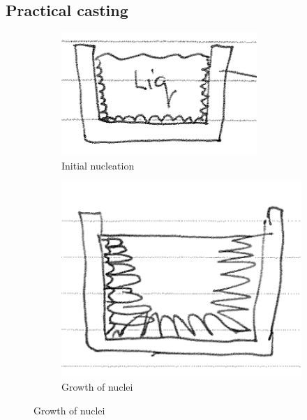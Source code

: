 \documentclass[class=report, crop=false, 12pt,a4paper]{standalone}
\begin{document}
\subsection{Practical casting}
\begin{figure}[h!]
  \centering
  \begin{subfigure}[b]{0.3\textwidth}
      \includegraphics[width=\textwidth]{../img/practicalcasting1}
      \caption{Initial nucleation}
      \label{fig:practicalcasting1}
  \end{subfigure}
  \begin{subfigure}[b]{0.3\textwidth}
      \includegraphics[width=\textwidth]{../img/practicalcasting2}
      \caption{Growth of nuclei}
      \label{fig:practicalcasting2}
  \end{subfigure}

\end{figure}
\end{document}
